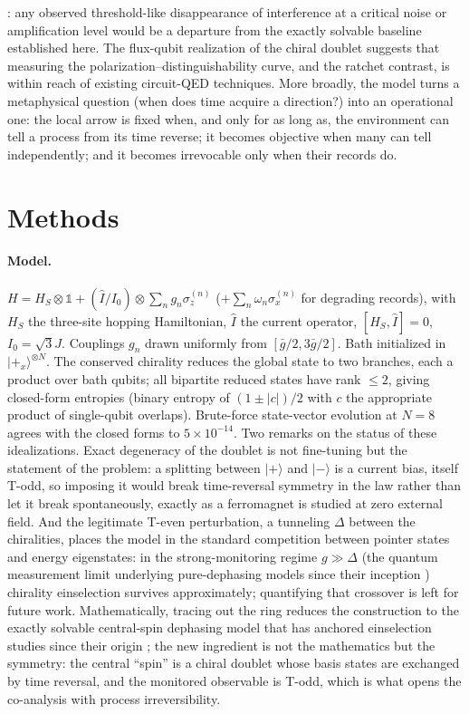 \documentclass[11pt]{article}
\newcommand{\Iop}{\hat{I}}
\begin{document}
\cite{Aharonov2000}: any observed threshold-like disappearance of interference at a critical noise or amplification level would be a departure from the exactly solvable baseline established here. The flux-qubit realization of the chiral doublet \cite{Friedman2000} suggests that measuring the polarization--distinguishability curve, and the ratchet contrast, is within reach of existing circuit-QED techniques. More broadly, the model turns a metaphysical question (when does time acquire a direction?) into an operational one: the local arrow is fixed when, and only for as long as, the environment can tell a process from its time reverse; it becomes objective when many can tell independently; and it becomes irrevocable only when their records do.

\section*{Methods}

\paragraph{Model.}
$H = H_S\otimes\mathbb1 + (\Iop/I_0)\otimes\sum_n g_n\sigma_z^{(n)}$ ($+\sum_n\omega_n\sigma_x^{(n)}$ for degrading records), with $H_S$ the three-site hopping Hamiltonian, $\Iop$ the current operator, $[H_S,\Iop]=0$, $I_0=\sqrt3 J$. Couplings $g_n$ drawn uniformly from $[\bar g/2, 3\bar g/2]$. Bath initialized in $|{+_x}\rangle^{\otimes N}$. The conserved chirality reduces the global state to two branches, each a product over bath qubits; all bipartite reduced states have rank $\le2$, giving closed-form entropies (binary entropy of $(1\pm|c|)/2$ with $c$ the appropriate product of single-qubit overlaps). Brute-force state-vector evolution at $N=8$ agrees with the closed forms to $5\times10^{-14}$. Two remarks on the status of these idealizations. Exact degeneracy of the doublet is not fine-tuning but the statement of the problem: a splitting between $|+\rangle$ and $|-\rangle$ is a current bias, itself T-odd, so imposing it would break time-reversal symmetry in the law rather than let it break spontaneously, exactly as a ferromagnet is studied at zero external field. And the legitimate T-even perturbation, a tunneling $\Delta$ between the chiralities, places the model in the standard competition between pointer states and energy eigenstates: in the strong-monitoring regime $g\gg\Delta$ (the quantum measurement limit underlying pure-dephasing models since their inception \cite{Zurek2003}) chirality einselection survives approximately; quantifying that crossover is left for future work. Mathematically, tracing out the ring reduces the construction to the exactly solvable central-spin dephasing model that has anchored einselection studies since their origin \cite{Zurek1981,Riedel2012}; the new ingredient is not the mathematics but the symmetry: the central ``spin'' is a chiral doublet whose basis states are exchanged by time reversal, and the monitored observable is T-odd, which is what opens the co-analysis with process irreversibility.
\end{document}
